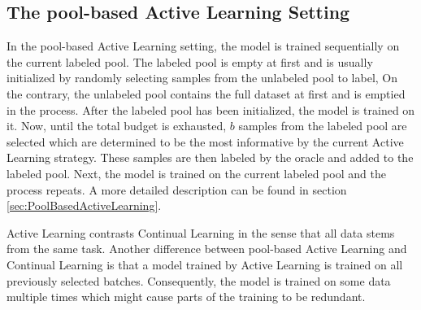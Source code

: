 \subsection{The pool-based Active Learning Setting}
\label{sec:Methodology:ALSetting}
In the pool-based Active Learning setting, the model is trained sequentially on the current labeled pool. The labeled pool is empty at first and is usually initialized
by randomly selecting samples from the unlabeled pool to label, On the contrary, the unlabeled pool contains the full dataset at first and is emptied in the process.
After the labeled pool has been initialized, the model is trained on it. Now, until the total budget is exhausted, $b$ samples from the labeled pool are selected which
are determined to be the most informative by the current Active Learning strategy. These samples are then labeled by the oracle and added to the labeled pool. Next, the
model is trained on the current labeled pool and the process repeats. A more detailed description can be found in section \ref{sec:PoolBasedActiveLearning}. \par
Active Learning contrasts Continual Learning in the sense that all data stems from the same task. Another difference between pool-based Active Learning and Continual
Learning is that a model trained by Active Learning is trained on all previously selected batches. Consequently, the model is trained on some data multiple times which
might cause parts of the training to be redundant.

